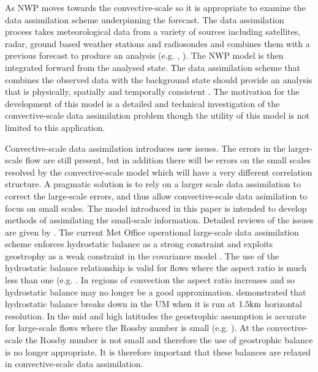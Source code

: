 \documentclass[times]{qjrms4}
\begin{document}
As NWP moves towards the convective-scale so it is appropriate to examine the data 
assimilation scheme underpinning the forecast. 
The data assimilation process takes 
meteorological data from a variety of sources including satellites, radar, ground 
based weather stations and radiosondes and combines them with a previous forecast 
to produce an analysis (e.g. \cite{daley_1991}, \cite{kalnay}).  The NWP model 
is then integrated forward from the analysed state.
The data assimilation scheme that combines the observed data with the background state 
should provide an analysis that is physically, spatially and temporally 
consistent \citep{daley_1991}.  
The motivation for the development of this model is a detailed and technical investigation of
the convective-scale data assimilation problem though the utility of this model is not limited to 
this application.

Convective-scale data assimilation introduces new issues. The errors in the larger-scale flow are still present, but in addition there will be errors on the small scales resolved by the convective-scale model which will have a very different correlation structure. A pragmatic solution is to rely on a larger scale data assimilation to correct the large-scale errors, and thus allow convective-scale data asimilation to focus on small scales. The model introduced in this paper is intended to develop methods of assimilating the small-scale information. Detailed 
reviews of the issues are given by  \cite{dance_2004, lorenc_2007, park_2003, sun_2005}.  
The current Met Office operational large-scale data assimilation scheme enforces hydrostatic balance 
as a strong constraint and exploits geostrophy as a weak constraint in the covariance model 
\citep{lorenc_2000,bannister_2008_2}.  
The use of the hydrostatic balance relationship is valid for flows where the aspect ratio is much 
less than one (e.g. \citep{holton, vallis}. 
In regions of convection the aspect ratio increases and so hydrostatic balance may no longer be a good approximation.  
\cite{vetra_2012} demonstrated that hydrostatic balance breaks down in the UM when it is run
at $1.5 \rm {km}$ horizontal resolution.
In the mid and high latitudes the geostrophic assumption is accurate for large-scale flows where the Rossby number is small (e.g. \cite{holton}). 
At the convective-scale the Rossby number is not small and therefore the use of geostrophic balance  
is no longer appropriate. 
It is therefore important that these balances are relaxed in convective-scale data assimilation.
\end{document}
